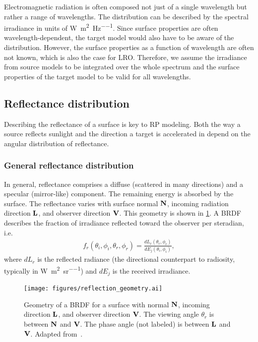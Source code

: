 Electromagnetic radiation is often composed not just of a single wavelength but rather a range of wavelengths. The distribution can be described by the spectral irradiance in units of \unit{\W\per\square\m\per\Hz}. Since surface properties are often wavelength-dependent, the target model would also have to be aware of the distribution. However, the surface properties as a function of wavelength are often not known, which is also the case for \gls{LRO}. Therefore, we assume the irradiance from source models to be integrated over the whole spectrum and the surface properties of the target model to be valid for all wavelengths.




\subsection{Reflectance distribution}
\label{subsec:general-reflectance-distribution}

Describing the reflectance of a surface is key to \gls{RP} modeling. Both the way a source reflects sunlight and the direction a target is accelerated in depend on the angular distribution of reflectance.

\subsubsection{General reflectance distribution}
In general, reflectance comprises a diffuse (scattered in many directions) and a specular (mirror-like) component. The remaining energy is absorbed by the surface. The reflectance varies with surface normal $\vb N$, incoming radiation direction $\vb L$, and observer direction $\vb V$. This geometry is shown in \cref{fig:reflection-geometry}. A \gls{BRDF} describes the fraction of irradiance reflected toward the observer per steradian, i.e.~\cite{Wetterer2014}
\begin{align}
    f_r (\theta_i, \phi_i, \theta_r, \phi_r)
    = \frac{dL_r(\theta_r, \phi_r)}
    {dE_j(\theta_i, \phi_i)},
\end{align}
where $dL_r$ is the reflected radiance (the directional counterpart to radiosity, typically in \unit{\W\per\square\m\per\steradian}) and $dE_j$ is the received irradiance.


\begin{figure}[b]
    \centering
    \texttt{[image: figures/reflection\_geometry.ai]}
    \caption{Geometry of a \gls{BRDF} for a surface with normal $\vb N$, incoming direction $\vb L$, and observer direction $\vb V$. The viewing angle $\theta_r$ is between $\vb N$ and $\vb V$. The phase angle (not labeled) is between $\vb L$ and $\vb V$. Adapted from~\cite{Wetterer2014}.}
    \label{fig:reflection-geometry}
\end{figure}


